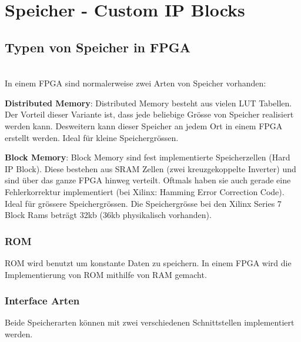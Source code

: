 \section{Speicher - Custom IP Blocks}
\subsection{Typen von Speicher in FPGA}$~$ \\
In einem FPGA sind normalerweise zwei Arten von Speicher vorhanden:
\begin{compactitem}
    \item \textbf{Distributed Memory}: Distributed Memory besteht aus vielen LUT Tabellen. Der Vorteil dieser Variante ist, dass jede beliebige Grösse von Speicher realisiert werden kann. Desweitern kann dieser Speicher an jedem Ort in einem FPGA erstellt werden. Ideal für kleine Speichergrössen.
    \item \textbf{Block Memory}: Block Memory sind fest implementierte Speicherzellen (Hard IP Block). Diese bestehen aus SRAM Zellen (zwei kreuzgekoppelte Inverter) und sind über das ganze FPGA hinweg verteilt. Oftmals haben sie auch gerade eine Fehlerkorrektur implementiert (bei Xilinx: Hamming Error Correction Code). Ideal für grössere Speichergrössen. Die Speichergrösse bei den Xilinx Series 7 Block Rams beträgt 32kb (36kb physikalisch vorhanden).
\end{compactitem}

\subsubsection{ROM}
ROM wird benutzt um konstante Daten zu speichern. In einem FPGA wird die Implementierung von ROM mithilfe von RAM gemacht.

\subsubsection{Interface Arten}
Beide Speicherarten können mit zwei verschiedenen Schnittstellen implementiert werden.

